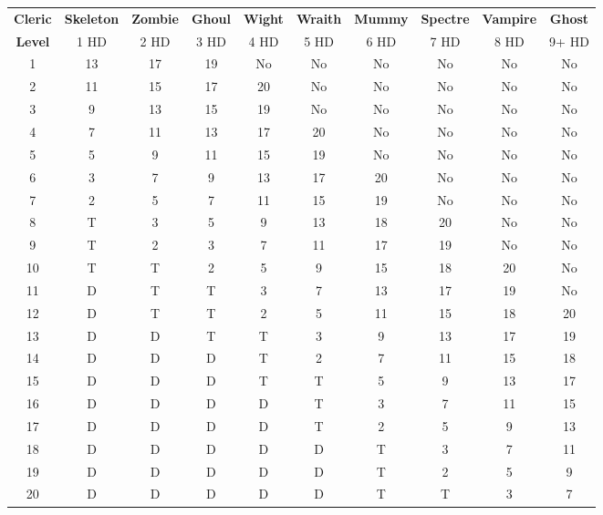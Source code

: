 \documentclass[a4paper,twoside,openany,10pt]{book}
\begin{document}
\begin{tabular*}{1\linewidth}{@{\extracolsep{\fill}}cccccccccc}
\textbf{Cleric}&\textbf{Skeleton}&\textbf{Zombie}&\textbf{Ghoul}&\textbf{Wight}&\textbf{Wraith}&\textbf{Mummy}&\textbf{Spectre}&\textbf{Vampire}&\textbf{Ghost}\\
\textbf{Level}&1 HD&2 HD&3 HD&4 HD&5 HD&6 HD&7 HD&8 HD&9+ HD\\\toprule
1  & 13 & 17 & 19 & No & No & No & No & No & No\\\hline
2  & 11 & 15 & 17 & 20 & No & No & No & No & No\\\hline
3  & 9  & 13 & 15 & 19 & No & No & No & No & No\\\hline
4  & 7  & 11 & 13 & 17 & 20 & No & No & No & No\\\hline
5  & 5  & 9  & 11 & 15 & 19 & No & No & No & No\\\hline
6  & 3  & 7  & 9  & 13 & 17 & 20 & No & No & No\\\hline
7  & 2  & 5  & 7  & 11 & 15 & 19 & No & No & No\\\hline
8  & T  & 3  & 5  & 9  & 13 & 18 & 20 & No & No\\\hline
9  & T  & 2  & 3  & 7  & 11 & 17 & 19 & No & No\\\hline
10 & T  & T  & 2  & 5  & 9  & 15 & 18 & 20 & No\\\hline
11 & D  & T  & T  & 3  & 7  & 13 & 17 & 19 & No\\\hline
12 & D  & T  & T  & 2  & 5  & 11 & 15 & 18 & 20\\\hline
13 & D  & D  & T  & T  & 3  & 9  & 13 & 17 & 19\\\hline
14 & D  & D  & D  & T  & 2  & 7  & 11 & 15 & 18\\\hline
15 & D  & D  & D  & T  & T  & 5  & 9  & 13 & 17\\\hline
16 & D  & D  & D  & D  & T  & 3  & 7  & 11 & 15\\\hline
17 & D  & D  & D  & D  & T  & 2  & 5  & 9  & 13\\\hline
18 & D  & D  & D  & D  & D  & T  & 3  & 7  & 11\\\hline
19 & D  & D  & D  & D  & D  & T  & 2  & 5  & 9\\\hline
20 & D  & D  & D  & D  & D  & T  & T  & 3  & 7\\\bottomrule
\end{tabular*}
\end{document}

